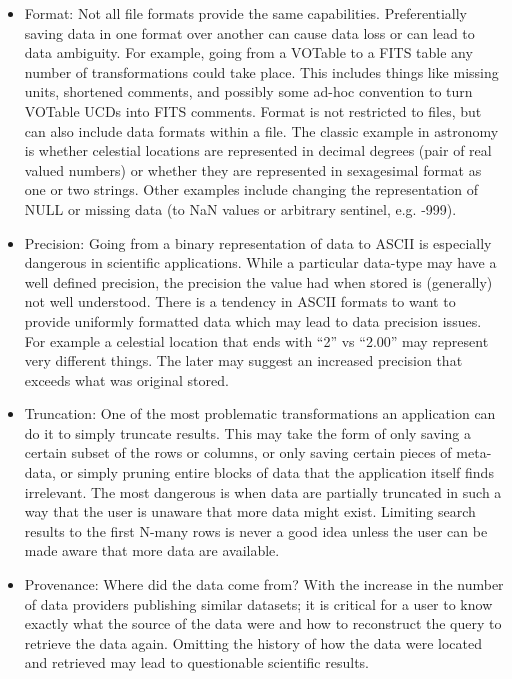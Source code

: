 \begin{itemize}

\item Format:  Not all file formats provide the same capabilities.  
  Preferentially saving data in one format over another can cause 
  data loss or can lead to data ambiguity.  For example, going from
  a VOTable to a FITS table any number of transformations could take place.
  This includes things like missing units, shortened comments, 
  and possibly some ad-hoc convention to turn VOTable UCDs into
  FITS comments.
  Format is not restricted to files, but can also include data formats within a file.  The classic example in astronomy is whether celestial
  locations are represented in decimal degrees (pair of real valued numbers)
  or  whether they are represented in sexagesimal format as one or two strings.
  Other examples include changing the representation of NULL or missing
  data (to NaN values or arbitrary sentinel, e.g. -999).


\item Precision:  Going from a binary representation of data to ASCII is 
  especially dangerous in scientific applications.   While a particular
data-type may have a well defined precision, the precision the 
value had when stored is (generally) not well understood. There is a
tendency in ASCII formats to want to provide uniformly formatted data which may
lead to data precision issues.  For example a celestial location that ends with ``2'' vs ``2.00'' may represent very different things.  The later may suggest
an increased precision that exceeds what was original stored.


\item Truncation:  One of the most problematic transformations an application
can do it to simply truncate results.  This may take the form of only saving 
a certain subset of the rows or columns, or only saving certain pieces
of meta-data, or simply pruning entire blocks of data that the
application itself finds irrelevant.  The most dangerous is when 
data are partially truncated in such a way that the user is unaware that
more data might exist.  Limiting search results to the first N-many
rows is never a good idea unless the user can be made aware that 
more data are available.


\item Provenance: Where did the data come from? With the increase in the number
of data providers publishing similar datasets; it is critical for a user
to know exactly what the source of the data were and how to reconstruct
the query to retrieve the data again.  Omitting the history of how the 
data were located and retrieved may lead to questionable scientific
results.

\end{itemize}


